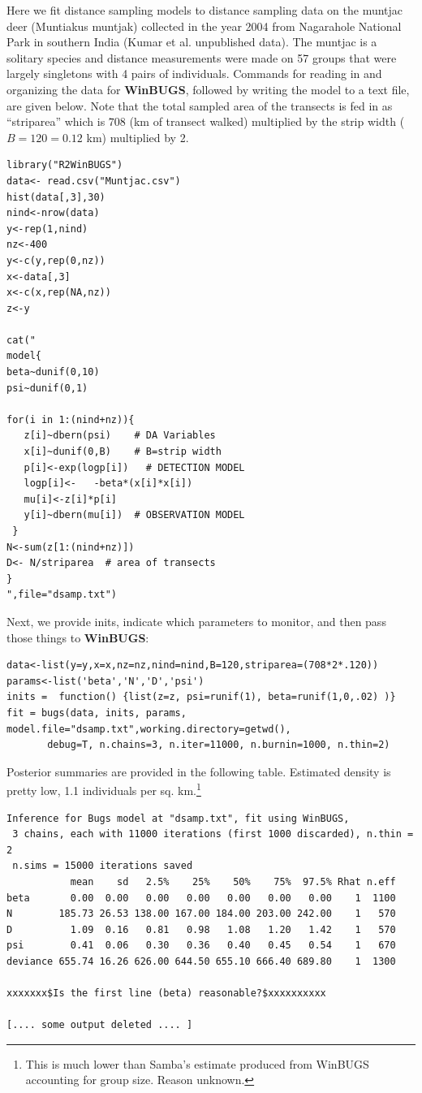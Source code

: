 Here we fit distance sampling models to distance sampling data on the
muntjac deer (Muntiakus muntjak) collected in the year 2004 from
Nagarahole National Park in southern India
(Kumar et al. unpublished data). The muntjac is
a solitary species and distance measurements were made on 57 groups
that were largely singletons with 4 pairs of individuals.  Commands
for reading in and organizing the data for {\bf WinBUGS}, followed by
writing the model to a text file, are given below. Note that the total sampled area of
the transects is fed in as ``striparea'' which is $708$ (km of transect walked)
multiplied by the strip width ($B=120 = 0.12$ km) multiplied by 2.
{\small 
\begin{verbatim}
library("R2WinBUGS")
data<- read.csv("Muntjac.csv")
hist(data[,3],30)
nind<-nrow(data)
y<-rep(1,nind)
nz<-400
y<-c(y,rep(0,nz))
x<-data[,3]
x<-c(x,rep(NA,nz))
z<-y

cat("
model{
beta~dunif(0,10)
psi~dunif(0,1)

for(i in 1:(nind+nz)){
   z[i]~dbern(psi)    # DA Variables
   x[i]~dunif(0,B)    # B=strip width
   p[i]<-exp(logp[i])   # DETECTION MODEL
   logp[i]<-   -beta*(x[i]*x[i])
   mu[i]<-z[i]*p[i]
   y[i]~dbern(mu[i])  # OBSERVATION MODEL
 }
N<-sum(z[1:(nind+nz)])
D<- N/striparea  # area of transects
}
",file="dsamp.txt")
\end{verbatim}
}
Next, we provide inits, indicate which parameters to monitor, and then
pass those things to {\bf WinBUGS}:
{\small
\begin{verbatim}
data<-list(y=y,x=x,nz=nz,nind=nind,B=120,striparea=(708*2*.120))
params<-list('beta','N','D','psi')
inits =  function() {list(z=z, psi=runif(1), beta=runif(1,0,.02) )}
fit = bugs(data, inits, params, model.file="dsamp.txt",working.directory=getwd(),    
       debug=T, n.chains=3, n.iter=11000, n.burnin=1000, n.thin=2)
\end{verbatim}
}
Posterior summaries are provided in the following table. Estimated
density is pretty low, 1.1 individuals per sq. km.\footnote{ This is much
  lower than Samba's estimate produced from WinBUGS accounting for group
  size. Reason unknown. }
{\small
\begin{verbatim}
Inference for Bugs model at "dsamp.txt", fit using WinBUGS,
 3 chains, each with 11000 iterations (first 1000 discarded), n.thin = 2
 n.sims = 15000 iterations saved
           mean    sd   2.5%    25%    50%    75%  97.5% Rhat n.eff
beta       0.00  0.00   0.00   0.00   0.00   0.00   0.00    1  1100
N        185.73 26.53 138.00 167.00 184.00 203.00 242.00    1   570
D          1.09  0.16   0.81   0.98   1.08   1.20   1.42    1   570
psi        0.41  0.06   0.30   0.36   0.40   0.45   0.54    1   670
deviance 655.74 16.26 626.00 644.50 655.10 666.40 689.80    1  1300

xxxxxxx$Is the first line (beta) reasonable?$xxxxxxxxxx

[.... some output deleted .... ]
\end{verbatim}
}

